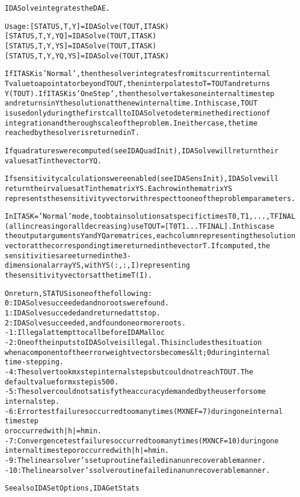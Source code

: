 \begin{alltt}
IDASolve integrates the DAE.

   Usage: [STATUS, T, Y] = IDASolve ( TOUT, ITASK ) 
          [STATUS, T, Y, YQ] = IDASolve  (TOUT, ITASK )
          [STATUS, T, Y, YS] = IDASolve ( TOUT, ITASK )
          [STATUS, T, Y, YQ, YS] = IDASolve ( TOUT, ITASK )

   If ITASK is 'Normal', then the solver integrates from its current internal 
   T value to a point at or beyond TOUT, then interpolates to T = TOUT and returns 
   Y(TOUT). If ITASK is 'OneStep', then the solver takes one internal time step 
   and returns in Y the solution at the new internal time. In this case, TOUT 
   is used only during the first call to IDASolve to determine the direction of 
   integration and the rough scale of the problem. In either case, the time 
   reached by the solver is returned in T.

   If quadratures were computed (see IDAQuadInit), IDASolve will return their
   values at T in the vector YQ.

   If sensitivity calculations were enabled (see IDASensInit), IDASolve will 
   return their values at T in the matrix YS. Each row in the matrix YS
   represents the sensitivity vector with respect to one of the problem parameters.

   In ITASK =' Normal' mode, to obtain solutions at specific times T0,T1,...,TFINAL
   (all increasing or all decreasing) use TOUT = [T0 T1  ... TFINAL]. In this case
   the output arguments Y and YQ are matrices, each column representing the solution
   vector at the corresponding time returned in the vector T. If computed, the 
   sensitivities are eturned in the 3-dimensional array YS, with YS(:,:,I) representing
   the sensitivity vectors at the time T(I).

   On return, STATUS is one of the following:
     0: IDASolve succeeded and no roots were found.
     1: IDASolve succeded and returned at tstop.
     2: IDASolve succeeded, and found one or more roots. 
    -1: Illegal attempt to call before IDAMalloc
    -2: One of the inputs to IDASolve is illegal. This includes the situation 
        when a component of the error weight vectors becomes &lt; 0 during internal 
        time-stepping.
    -4: The solver took mxstep internal steps but could not reach TOUT. The 
        default value for mxstep is 500.
    -5: The solver could not satisfy the accuracy demanded by the user for some 
        internal step.
    -6: Error test failures occurred too many times (MXNEF = 7) during one internal 
        time step 
        or occurred with |h| = hmin.
    -7: Convergence test failures occurred too many times (MXNCF = 10) during one 
        internal time step or occurred with |h| = hmin.
    -9: The linear solver's setup routine failed in an unrecoverable manner.
   -10: The linear solver's solve routine failed in an unrecoverable manner.


   See also IDASetOptions, IDAGetStats
\end{alltt}






\vspace{0.1in}